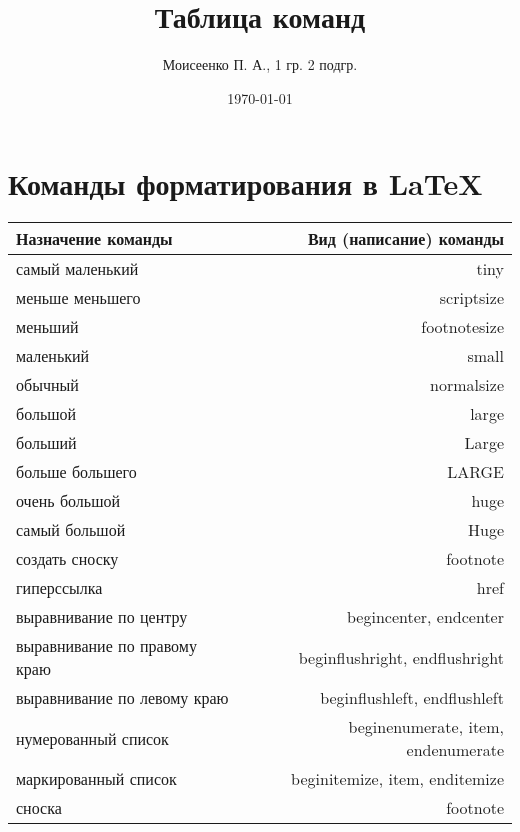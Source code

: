 \documentclass[a4paper,12pt]{article} %
\author{Моисеенко П. А., 1 гр. 2 подгр.} %
\title{Таблица команд} %
\date{\today} %
\begin{document}
\maketitle
\newpage
\section*{Команды форматирования в \LaTeX}
\begin{tabular}{ l | r }
  \textbf{Назначение команды} & \textbf{Вид (написание) команды} \\ \hline
  самый маленький			  & tiny \\ \hline
  меньше меньшего			  & scriptsize \\ \hline
  меньший					  & footnotesize \\ \hline
  маленький					  & small \\ \hline
  обычный					  & normalsize \\ \hline
  большой					  & large \\ \hline
  больший					  & Large \\ \hline
  больше большего			  & LARGE \\ \hline
  очень большой				  & huge \\ \hline
  самый большой				  & Huge \\ \hline
  создать сноску			  & footnote \\ \hline
  гиперссылка				  & href \\ \hline
  выравнивание по центру	  & begin{center}, end{center} \\ \hline
  выравнивание по правому краю & begin{flushright}, end{flushright} \\ \hline
  выравнивание по левому краю & begin{flushleft}, end{flushleft} \\ \hline
  нумерованный список 		  & begin{enumerate}, item, end{enumerate} \\ \hline
  маркированный список		  & begin{itemize}, item, end{itemize} \\ \hline
  сноска					  & footnote
\end{tabular}
\end{document}
